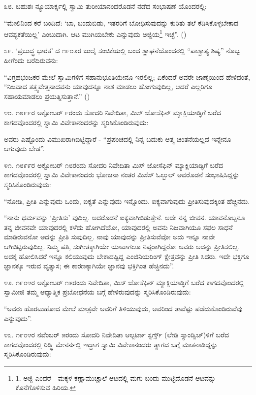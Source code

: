 ೩೮. ಬಹುಶಃ ನ್ಯೂಯಾರ್ಕ್ನಲ್ಲಿ ಸ್ವಾಮಿ ತುರೀಯಾನಂದರೊಡನೆ ನಡೆದ ಸಂಭಾಷಣೆ ಯೊಂದರಲ್ಲಿ:

“ಮೇಲಿನಿಂದ ಕರೆ ಬಂದಿದೆ: ‘ಬಾ, ಬಂದುಬಿಡು, ಇತರರಿಗೆ ಬೋಧಿಸುವುದನ್ನು ಕುರಿತು ತಲೆ ಕೆಡಿಸಿಕೊಳ್ಳಬೇಕಾದ ಆವಶ್ಯಕತೆಯಿಲ್ಲ’ ಎಂಬುದಾಗಿ. ಆಟ ಮುಗಿಯಬೇಕು ಎನ್ನುವುದು ಅಜ್ಜಿಯ\footnote{1. ಅಜ್ಜಿ ಎಂದರೆ - ಮಕ್ಕಳ ಕಣ್ಣಾಮುಚ್ಚಾಲೆ ಆಟದಲ್ಲಿ ಮಗು ಬಂದು ಮುಟ್ಟಿದೊಡನೆ ಆಟವನ್ನು ಕೊನೆಗೊಳಿಸುವ ಹಿರಿಯ.} ಇಚ್ಛೆ”. ()

೩೯. ‘ಪ್ರಬುದ್ಧ ಭಾರತ’ ದ ೧೯೦೨ರ ಜುಲೈ ಸಂಚಿಕೆಯಲ್ಲಿ ಬಂದ ಶ್ಲಾಘನೆಯೊಂದರಲ್ಲಿ “ಪಾಶ್ಚಾತ್ಯ ಶಿಷ್ಯ” ನೊಬ್ಬ ಹೀಗೆಂದು ಬರೆದಿರುವನು:

“ವಿಗ್ರಹಭಂಜಕರ ಮೇಲೆ ಸ್ವಾಮಿಗಳಿಗೆ ಸಹಾನುಭೂತಿಯೇನೂ ಇರಲಿಲ್ಲ; ಏಕೆಂದರೆ ಅವರೇ ಜಾಣ್ಮೆಯಿಂದ ಹೇಳಿದಂತೆ, “ನಿಜವಾದ ತತ್ತ್ವವೇತ್ತನಾದವನು ಯಾವುದನ್ನೂ ನಾಶ ಮಾಡಲು ಹೋಗುವುದಿಲ್ಲ, ಆದರೆ ಎಲ್ಲರಿಗೂ ಸಹಾಯಮಾಡಲು ಪ್ರಯತ್ನಿಸುತ್ತಾನೆ.” ()

೪೦. ೧೮೯೯ರ ಅಕ್ಟೋಬರ್ ೯ರಂದು ಸೋದರಿ ನಿವೇದಿತಾ, ಮಿಸ್ ಜೋಸೆಫಿನ್ ಮ್ಯಾಕ್ಲಿಯಾಡ್ಳಿಗೆ ಬರೆದ ಕಾಗದವೊಂದರಲ್ಲಿ ಸ್ವಾಮಿ ವಿವೇಕಾನಂದರನ್ನು ಸ್ಮರಿಸಿಕೊಂಡಿರುವುದು:

ಅವರು ಎಷ್ಟೊಂದು ವಿಮುಖರಾಗಿಬಿಟ್ಟಿದ್ದಾರೆ - “ಪ್ರಪಂಚದಲ್ಲಿ ನಿನ್ನ ಬದುಕು ಆತ್ಮ ಚಿಂತನೆಯಲ್ಲದೆ ಇನ್ನೇನೂ ಆಗುವುದು ಬೇಡ”. 

೪೧. ೧೮೯೯ರ ಅಕ್ಟೋಬರ್ ೧೮ರಂದು ಸೋದರಿ ನಿವೇದಿತಾ ಮಿಸ್ ಜೋಸೆಫಿನ್ ಮ್ಯಾಕ್ಲಿಯಾಡ್ಳಿಗೆ ಬರೆದ ಕಾಗದವೊಂದರಲ್ಲಿ ಸ್ವಾಮಿ ವಿವೇಕಾನಂದರು ಭೋಜನಾ ನಂತರ ಮಿಸೆಸ್ ಓಲ್ಬುಲ್ ಅವರೊಡನೆ ಸಂಭಾಷಿಸಿದ್ದನ್ನು ಸ್ಮರಿಸಿಕೊಂಡಿರುವುದು:

“ನೋಡಿ, ಪ್ರೀತಿ ಎನ್ನುವುದು ಒಂದು, ಐಕ್ಯತೆ ಎನ್ನುವುದು ಇನ್ನೊಂದು. ಐಕ್ಯವಾಗುವುದು ಪ್ರೀತಿಸುವುದಕ್ಕಿಂತ ಹೆಚ್ಚಿನದು.

“ನಾನು ಧರ್ಮವನ್ನು ‘ಪ್ರೀತಿಸು’ ವುದಿಲ್ಲ. ಅದರೊಡನೆ ಐಕ್ಯವಾಗಿಬಿಡುತ್ತೇನೆ. ಅದೇ ನನ್ನ ಜೀವನ. ಯಾವನೊಬ್ಬನೂ ತನ್ನ ಜೀವನವೇ ಯಾವುದರಲ್ಲಿ ಕಳೆದು ಹೋಗಿದೆಯೋ, ಯಾವುದರಲ್ಲಿ ಅವನು ನಿಜವಾಗಿಯೂ ಸಫಲ ಸಾಧನೆ ಮಾಡಿರುವನೋ ಅದನ್ನು ಪ್ರೀತಿ ಸುವುದಿಲ್ಲ. ನಾವು ಯಾವುದನ್ನು ಪ್ರೀತಿಸುವೆವೋ ಅದು ಇನ್ನೂ ನಾವೇ ಆಗಿಬಿಟ್ಟಿರುವುದಿಲ್ಲ. ನಿಮ್ಮ ಪತಿ, ಸಂಗೀತಕ್ಕಾಗಿಯೇ ಯಾವಾಗಲೂ ನಿಷ್ಠರಾಗಿದ್ದರೋ ಅವರು ಅದನ್ನು ಪ್ರೀತಿಸಲಿಲ್ಲ. ಅದಕ್ಕೆ ಹೋಲಿಸಿದರೆ ಇನ್ನೂ ಕಲಿಯುವುದು ಬೇಕಾದಷ್ಟಿದ್ದ ಎಂಜಿನಿಯರಿಂಗ್ ಕ್ಷೇತ್ರವನ್ನು ಪ್ರೀತಿ ಸಿದರು. ಇದೇ ಭಕ್ತಿಗೂ ಜ್ಞಾನಕ್ಕೂ ಇರುವ ವ್ಯತ್ಯಾಸ; ಈ ಕಾರಣಕ್ಕಾಗಿಯೇ ಜ್ಞಾನವು ಭಕ್ತಿಗಿಂತ ಹೆಚ್ಚಿನದು”. 

೪೨. ೧೯೦೪ರ ಅಕ್ಟೋಬರ್ ೧೫ರಂದು ನಿವೇದಿತಾ, ಮಿಸ್ ಜೋಸೆಫಿನ್ ಮ್ಯಾಕ್ಲಿಯಾಡ್ಳಿಗೆ ಬರೆದ ಕಾಗದವೊಂದರಲ್ಲಿ ಸ್ವಾಮೀಜಿ ತಮ್ಮ ಆಧ್ಯಾತ್ಮಿಕ ಪ್ರಬೋಧನೆಯ ಬಗ್ಗೆ ಹೇಳಿರುವುದನ್ನು ಸ್ಮರಿಸಿಕೊಂಡಿರುವುದು:

“ಅವರು ಹೊರಟುಹೋದ ಮೇಲೆ ಮಾತ್ರವೇ ಅವರಿಗೆ ತಿಳಿಯುವುದು, ಅವರಿಂದ ತಾವೆಷ್ಟು ಪಡೆದುಕೊಂಡಿರುವೆವು ಎನ್ನುವುದು”. 

೪೩. ೧೯೦೪ರ ನವೆಂಬರ್ ೫ರಂದು ಸೋದರಿ ನಿವೇದಿತಾ ಆಲ್ಬರ್ಟಾ ಸ್ಟರ್ಗ್ಸ್ (ಲೇಡಿ ಸ್ಯಾಂಡ್ವಿಚ್)ಳಿಗೆ ಬರೆದ ಕಾಗದವೊಂದರಲ್ಲಿ ರಿಡ್ಜ್ಲಿ ಮೇನರ್ನಲ್ಲಿ ಇದ್ದಾಗ ಸ್ವಾಮಿ ವಿವೇಕಾನಂದರು ತ್ಯಾಗದ ಬಗ್ಗೆ ಮಾತನಾಡಿದ್ದನ್ನು ಸ್ಮರಿಸಿಕೊಂಡಿರುವುದು:

